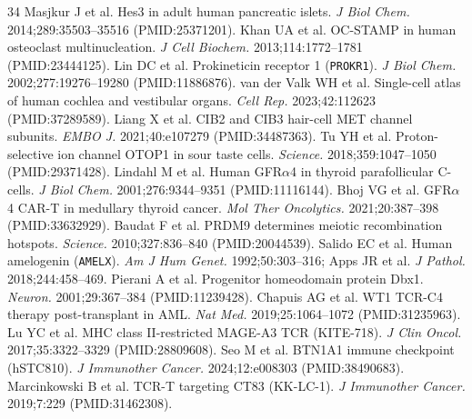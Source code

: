 \documentclass[10pt,letterpaper]{article}
\begin{document}
\begin{thebibliography}{34}
 Masjkur J et al. Hes3 in adult human pancreatic islets. \emph{J Biol Chem.} 2014;289:35503--35516 (PMID:25371201).
 Khan UA et al. OC-STAMP in human osteoclast multinucleation. \emph{J Cell Biochem.} 2013;114:1772--1781 (PMID:23444125).
 Lin DC et al. Prokineticin receptor 1 (\texttt{PROKR1}). \emph{J Biol Chem.} 2002;277:19276--19280 (PMID:11886876).
 van der Valk WH et al. Single-cell atlas of human cochlea and vestibular organs. \emph{Cell Rep.} 2023;42:112623 (PMID:37289589).
 Liang X et al. CIB2 and CIB3 hair-cell MET channel subunits. \emph{EMBO J.} 2021;40:e107279 (PMID:34487363).
 Tu YH et al. Proton-selective ion channel OTOP1 in sour taste cells. \emph{Science.} 2018;359:1047--1050 (PMID:29371428).
 Lindahl M et al. Human GFR$\alpha$4 in thyroid parafollicular C-cells. \emph{J Biol Chem.} 2001;276:9344--9351 (PMID:11116144).
 Bhoj VG et al. GFR$\alpha$4 CAR-T in medullary thyroid cancer. \emph{Mol Ther Oncolytics.} 2021;20:387--398 (PMID:33632929).
 Baudat F et al. PRDM9 determines meiotic recombination hotspots. \emph{Science.} 2010;327:836--840 (PMID:20044539).
 Salido EC et al. Human amelogenin (\texttt{AMELX}). \emph{Am J Hum Genet.} 1992;50:303--316; Apps JR et al. \emph{J Pathol.} 2018;244:458--469.
 Pierani A et al. Progenitor homeodomain protein Dbx1. \emph{Neuron.} 2001;29:367--384 (PMID:11239428).
 Chapuis AG et al. WT1 TCR-C4 therapy post-transplant in AML. \emph{Nat Med.} 2019;25:1064--1072 (PMID:31235963).
 Lu YC et al. MHC class II-restricted MAGE-A3 TCR (KITE-718). \emph{J Clin Oncol.} 2017;35:3322--3329 (PMID:28809608).
 Seo M et al. BTN1A1 immune checkpoint (hSTC810). \emph{J Immunother Cancer.} 2024;12:e008303 (PMID:38490683).
 Marcinkowski B et al. TCR-T targeting CT83 (KK-LC-1). \emph{J Immunother Cancer.} 2019;7:229 (PMID:31462308).
\end{thebibliography}
\end{document}
